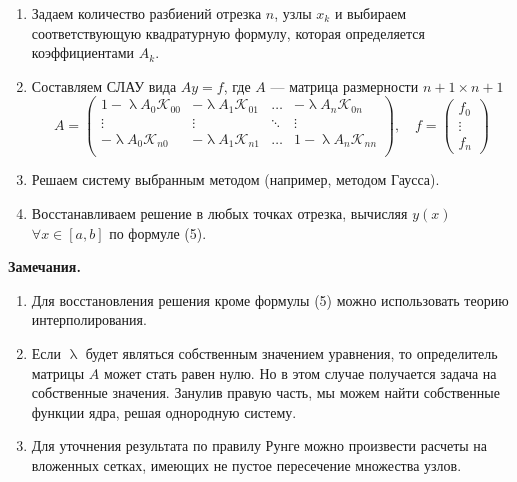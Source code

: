 \documentclass[a4paper, 12pt]{report}
\renewcommand{\lambda}{\uplambda}
\begin{document}
	\begin{enumerate}
		\item Задаем количество разбиений отрезка $n$, узлы $x_k$ и выбираем соответствующую квадратурную формулу, которая определяется коэффициентами $A_k$.
		\item Составляем СЛАУ вида $Ay = f$, где $A$ --- матрица размерности $n+1\times n+1$
		$$A = \begin{pmatrix}
			1 - \lambda A_0 \mathcal K_{00} & -\lambda A_1 \mathcal K_{01} & \ldots & -\lambda A_n \mathcal K_{0n}\\
			\vdots & \vdots & \ddots & \vdots \\
			 - \lambda A_0 \mathcal K_{n0} & -\lambda A_1 \mathcal K_{n1} & \ldots & 1-\lambda A_n \mathcal K_{nn}\\
		\end{pmatrix},\quad f= \begin{pmatrix}
		f_0 \\ \vdots \\ f_n
		\end{pmatrix}$$
		\item Решаем систему выбранным методом (например, методом Гаусса).
		\item Восстанавливаем решение в любых точках отрезка, вычисляя $y(x)$ $\forall x \in [a,b]$ по формуле (5).
 	\end{enumerate}
 	\textbf{Замечания.}
 	\begin{enumerate}
 		\item Для восстановления решения кроме формулы (5) можно использовать теорию интерполирования.
 		\item Если $\lambda$ будет являться собственным значением уравнения, то определитель матрицы $A$ может стать равен нулю. Но в этом случае получается задача на собственные значения. Занулив правую часть, мы можем найти собственные функции ядра, решая однородную систему.
 		\item Для уточнения результата по правилу Рунге можно произвести расчеты на вложенных сетках, имеющих не пустое пересечение множества узлов.
 	\end{enumerate}
\end{document}
